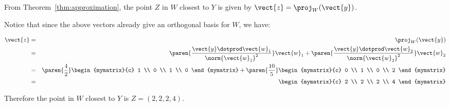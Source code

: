\begin{solution}
From Theorem~\ref{thm:approximation}, the point $Z$ in $W$ closest to
$Y$ is given by $\vect{z} = \proj_{W}(\vect{y})$.

Notice that since the above vectors already give an orthogonal basis for $W$, we have:

\begin{eqnarray*}
\vect{z} &=& \proj_{W}(\vect{y})\\
&=&
\paren{\frac{\vect{y} \dotprod \vect{w}_1}{ \norm{\vect{w}_1}^2}} \vect{w}_1
+
\paren{\frac{\vect{y} \dotprod \vect{w}_2}{ \norm{\vect{w}_2}^2}} \vect{w}_2 \\
&=&
\paren{\frac{4}{2}} \begin{mymatrix}{c}
1 \\
0 \\
1 \\
0
\end{mymatrix}
+
\paren{\frac{10}{5}}
\begin{mymatrix}{c}
0 \\
1 \\
0 \\
2
\end{mymatrix} \\
&=&
\begin{mymatrix}{c}
2 \\
2 \\
2 \\
4
\end{mymatrix}
\end{eqnarray*}

Therefore the point in $W$ closest to $Y$ is $Z = (2,2,2,4)$. \\


\end{solution}
